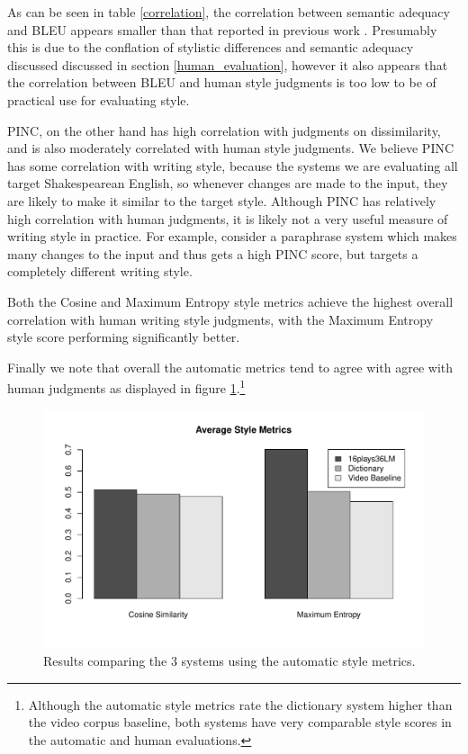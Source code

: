\documentclass[10pt,a5paper,twoside]{article}
\begin{document}
As can be seen in table \ref{correlation}, the correlation between semantic adequacy and BLEU appears smaller than that reported in previous work \cite{chen11}.  Presumably this is
due to the conflation of stylistic differences and semantic adequacy discussed discussed in section \ref{human_evaluation}, however it also appears 
that the correlation between BLEU and human style judgments is too low to be of practical use for evaluating style.

PINC, on the other hand has high correlation with judgments on dissimilarity, and is also moderately correlated with human style
judgments.  We believe PINC has some correlation with writing style, because the systems we are evaluating all target Shakespearean English, 
so whenever changes are made to the input, they are likely to make it similar to the target style.
Although PINC has relatively high correlation with human judgments, it is likely not a very useful measure of writing style in practice.
For example, consider a paraphrase system which makes many changes to the input and thus gets a high PINC score, but targets a completely different writing style.

Both the Cosine and Maximum Entropy style metrics achieve the highest overall correlation with human writing style judgments, with the Maximum Entropy style score performing significantly better.

Finally we note that overall the automatic metrics tend to agree with agree with human judgments as displayed in figure \ref{style_metrics}.\footnote{
  Although the automatic style metrics rate the dictionary system higher than the video corpus baseline, both systems have very comparable
  style scores in the automatic and human evaluations.
}

\begin{figure}
  \begin{center}
    \includegraphics[width=5in]{figures/style_metrics.pdf}
    \end{center}
    \caption{Results comparing the 3 systems using the automatic style metrics.}
    \label{style_metrics}
\end{figure}
\end{document}
